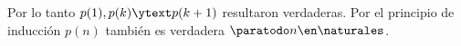 \bigskip

Por lo tanto $p(1), p(k) \ytext p(k+1)$ resultaron verdaderas. Por el principio de inducción $p(n)$ también es verdadera $\paratodo n \en \naturales$.

\begin{aportes}
  \item {}
\end{aportes}
